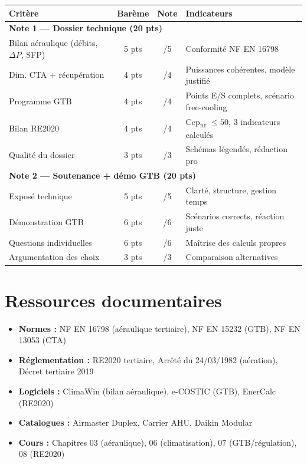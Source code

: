 \begin{center}
\begin{tabular}{p{5.5cm}ccp{4.5cm}}
  \toprule
  \textbf{Critère} & \textbf{Barème} & \textbf{Note} & \textbf{Indicateurs} \\
  \midrule
  \multicolumn{4}{l}{\textbf{Note 1 — Dossier technique (20 pts)}} \\
  \midrule
  Bilan aéraulique (débits, $\Delta P$, SFP) & 5 pts & /5 & Conformité NF EN 16798 \\
  Dim. CTA + récupération & 4 pts & /4 & Puissances cohérentes, modèle justifié \\
  Programme GTB & 4 pts & /4 & Points E/S complets, scénario free-cooling \\
  Bilan RE2020 & 4 pts & /4 & Cep\textsubscript{nr} $\leq 50$, 3 indicateurs calculés \\
  Qualité du dossier & 3 pts & /3 & Schémas légendés, rédaction pro \\
  \midrule
  \multicolumn{4}{l}{\textbf{Note 2 — Soutenance + démo GTB (20 pts)}} \\
  \midrule
  Exposé technique & 5 pts & /5 & Clarté, structure, gestion temps \\
  Démonstration GTB & 6 pts & /6 & Scénarios corrects, réaction juste \\
  Questions individuelles & 6 pts & /6 & Maîtrise des calculs propres \\
  Argumentation des choix & 3 pts & /3 & Comparaison alternatives \\
  \bottomrule
\end{tabular}
\end{center}

\section{Ressources documentaires}

\begin{itemize}
  \item \textbf{Normes :} NF EN 16798 (aéraulique tertiaire), NF EN 15232 (GTB), NF EN 13053 (CTA)
  \item \textbf{Réglementation :} RE2020 tertiaire, Arrêté du 24/03/1982 (aération), Décret tertiaire 2019
  \item \textbf{Logiciels :} ClimaWin (bilan aéraulique), e-COSTIC (GTB), EnerCalc (RE2020)
  \item \textbf{Catalogues :} Airmaster Duplex, Carrier AHU, Daikin Modular
  \item \textbf{Cours :} Chapitres 03 (aéraulique), 06 (climatisation), 07 (GTB/régulation), 08 (RE2020)
\end{itemize}

\finchapitre
